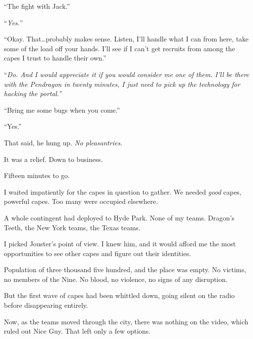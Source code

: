 ``The fight with Jack.''



``\emph{Yes.}''



``Okay.  That\ldots probably makes sense.  Listen, I'll handle what I can from here, take some of the load off your hands.  I'll see if I can't get recruits from among the capes I trust to handle their own.''



``\emph{Do.  And I would appreciate it if you would consider me one of them.  I'll be there }\emph{with the Pendragon in twenty minutes, I just need to pick up the technology for hacking the portal.''}



``Bring me some bugs when you come.''



``Yes.''



That said, he hung up.  \emph{No pleasantries}.



It was a relief.  Down to business.



\blacksquare



Fifteen minutes to go.



I waited impatiently for the capes in question to gather.  We needed \emph{good} capes, powerful capes.  Too many were occupied elsewhere.



A whole contingent had deployed to Hyde Park.  None of my teams.  Dragon's Teeth, the New York teams, the Texas teams.



I picked Jouster's point of view.  I knew him, and it would afford me the most opportunities to see other capes and figure out their identities.



Population of three thousand five hundred, and the place was empty.  No victims, no members of the Nine.  No blood, no violence, no signs of any disruption.



But the first wave of capes had been whittled down, going silent on the radio before disappearing entirely.



Now, as the teams moved through the city, there was nothing on the video, which ruled out Nice Guy.  That left only a few options.



